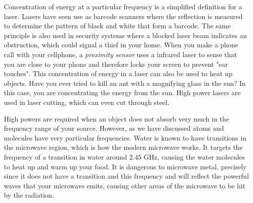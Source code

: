 Concentration of energy at a particular frequency is a simplified definition for a laser. Lasers have seen use as barcode scanners where the reflection is measured to determine the pattern of black and white that form a barcode. The same principle is also used in security systems where a blocked laser beam indicates an obstruction, which could signal a thief in your home. When you make a phone call with your cellphone, a \textit{proximity sensor} uses a infrared laser to sense that you are close to your phone and therefore locks your screen to prevent "ear touches". This concentration of energy in a laser can also be used to heat up objects. Have you ever tried to kill an ant with a magnifying glass in the sun? In this case, you are concentrating the energy from the sun. High power lasers are used in laser cutting, which can even cut through steel. 

High powers are required when an object does not absorb very much in the frequency range of your source. However, as we have discussed atoms and molecules have very particular frequencies. Water is known to have transitions in the microwave region, which is how the modern microwave works. It targets the frequency of a transition in water around 2.45 GHz, causing the water molecules to heat up and warm up your food. It is dangerous to microwave metal, precisely since it does not have a transition and this frequency and will reflect the powerful waves that your microwave emits, causing other areas of the microwave to be hit by the radiation.

